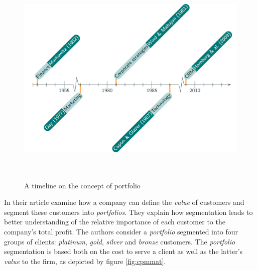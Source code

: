\documentclass[
]{book}
\begin{document}
\begin{figure}

{\centering \includegraphics[width=400pt,height=300pt]{./imgs/portfolio_timeline} 

}

\caption{A timeline on the concept of portfolio}\label{fig:timeline}
\end{figure}

In their article \citet{CPM_CRM} examine how a company can define the
\emph{value} of customers and segment these customers into \emph{portfolios}. They explain how segmentation leads to better understanding of the relative importance of each customer to the company's total profit. The authors consider a \emph{portfolio} segmented into four groups of clients: \emph{platinum}, \emph{gold}, \emph{silver} and \emph{bronze} customers. The \emph{portfolio} segmentation is based both on the cost to serve a client as well as the latter's \emph{value} to the firm, as depicted by figure \ref{fig:cpmmat}.
\end{document}
